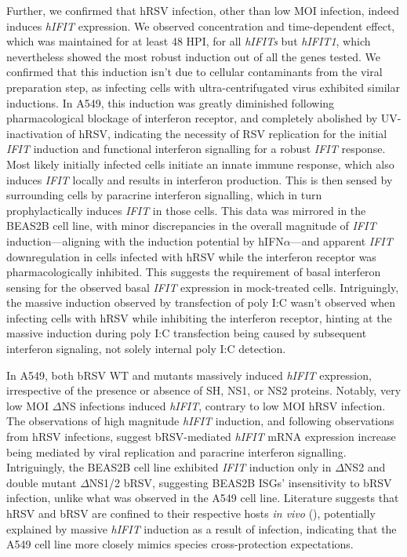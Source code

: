 Further, we confirmed that hRSV infection, other than low MOI infection, indeed induces \textit{hIFIT} expression. We observed concentration and time-dependent effect, which was maintained for at least 48 HPI, for all \textit{hIFITs} but \textit{hIFIT1}, which nevertheless showed the most robust induction out of all the genes tested. We confirmed that this induction isn't due to cellular contaminants from the viral preparation step, as infecting cells with ultra-centrifugated virus exhibited similar inductions.  In A549, this induction was greatly diminished following pharmacological blockage of interferon receptor, and completely abolished by UV-inactivation of hRSV, indicating the necessity of RSV replication for the initial \textit{IFIT} induction and functional interferon signalling for a robust \textit{IFIT} response. Most likely initially infected cells initiate an innate immune response, which also induces \textit{IFIT} locally and results in interferon production. This is then sensed by surrounding cells by paracrine interferon signalling, which in turn prophylactically induces \textit{IFIT} in those cells. This data was mirrored in the BEAS2B cell line, with minor discrepancies in the overall magnitude of \textit{IFIT} induction—aligning with the induction potential by hIFN$\alpha$—and apparent \textit{IFIT} downregulation in cells infected with hRSV while the interferon receptor was pharmacologically inhibited. This suggests the requirement of basal interferon sensing for the observed basal \textit{IFIT} expression in mock-treated cells. Intriguingly, the massive induction observed by transfection of poly I:C wasn't observed when infecting cells with hRSV while inhibiting the interferon receptor, hinting at the massive induction during poly I:C transfection being caused by subsequent interferon signaling, not solely internal poly I:C detection.

In A549, both bRSV WT and mutants massively induced \textit{hIFIT} expression, irrespective of the presence or absence of SH, NS1, or NS2 proteins. Notably, very low MOI $\Delta$NS infections induced \textit{hIFIT}, contrary to low MOI hRSV infection. The observations of high magnitude \textit{hIFIT} induction, and following observations from hRSV infections, suggest bRSV-mediated \textit{hIFIT} mRNA expression increase being mediated by viral replication and paracrine interferon signalling. Intriguingly, the BEAS2B cell line exhibited \textit{IFIT} induction only in $\Delta$NS2 and double mutant $\Delta$NS1/2 bRSV, suggesting BEAS2B ISGs' insensitivity to bRSV infection, unlike what was observed in the A549 cell line. Literature suggests that hRSV and bRSV are confined to their respective hosts \textit{in vivo} (\cite{Buchholz2000ChimericVaccine}), potentially explained by massive \textit{hIFIT} induction as a result of infection, indicating that the A549 cell line more closely mimics species cross-protection expectations.

